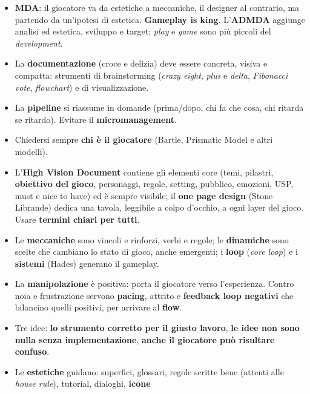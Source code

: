 \begin{itemize}
        padre e figlio, esplorazione) tengono la visione; l'\textbf{iterazione}
        trasforma l'idea (da Killzone con i dinosauri a Horizon).
  \item \textbf{MDA}: il giocatore va da estetiche a meccaniche, il designer al
        contrario, ma partendo da un'ipotesi di estetica. \textbf{Gameplay is
        king}. L'\textbf{ADMDA} aggiunge analisi ed estetica, sviluppo e target;
        \emph{play} e \emph{game} sono più piccoli del \emph{development}.
  \item La \textbf{documentazione} (croce e delizia) deve essere concreta, visiva
        e compatta: strumenti di brainstorming (\emph{crazy eight}, \emph{plus} e
        \emph{delta}, \emph{Fibonacci vote}, \emph{flowchart}) e di
        visualizzazione.
  \item La \textbf{pipeline} si riassume in domande (prima/dopo, chi fa che cosa,
        chi ritarda se ritardo). Evitare il \textbf{micromanagement}.
  \item Chiedersi sempre \textbf{chi è il giocatore} (Bartle, Prismatic Model e
        altri modelli).
  \item L'\textbf{High Vision Document} contiene gli elementi core (temi,
        pilastri, \textbf{obiettivo del gioco}, personaggi, regole, setting,
        pubblico, emozioni, USP, must e nice to have) ed è sempre visibile; il
        \textbf{one page design} (Stone Librande) dedica una tavola, leggibile a
        colpo d'occhio, a ogni layer del gioco. Usare \textbf{termini chiari per
        tutti}.
  \item Le \textbf{meccaniche} sono vincoli e rinforzi, verbi e regole; le
        \textbf{dinamiche} sono scelte che cambiano lo stato di gioco, anche
        emergenti; i \textbf{loop} (\emph{core loop}) e i \textbf{sistemi}
        (Hades) generano il gameplay.
  \item La \textbf{manipolazione} è positiva: porta il giocatore verso
        l'esperienza. Contro noia e frustrazione servono \textbf{pacing},
        attrito e \textbf{feedback loop negativi} che bilancino quelli positivi,
        per arrivare al \textbf{flow}.
  \item Tre idee: \textbf{lo strumento corretto per il giusto lavoro}, \textbf{le
        idee non sono nulla senza implementazione}, \textbf{anche il giocatore può
        risultare confuso}.
  \item Le \textbf{estetiche} guidano: superfici, glossari, regole scritte bene
        (attenti alle \emph{house rule}), tutorial, dialoghi, \textbf{icone}

\end{itemize}
